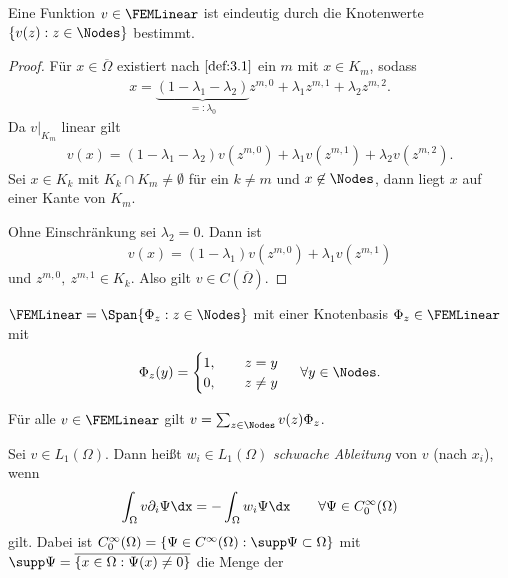 \begin{Satz}
    \label{satz:3.3}
    Eine Funktion $v \in \FEMLinear$ ist eindeutig durch die Knotenwerte $\{ v(z) : z \in \Nodes \}$ bestimmt.
\end{Satz}


\begin{proof}
    Für $x \in \overline\Omega$ existiert nach $\eqref{def:3.1}$ ein $m$ mit
    $x \in K_m$, sodass
    \begin{eqnarray*}
          x
        = \underbrace{(1 - \lambda_1 - \lambda_2)}_{=: \lambda_0} z^{m,0}
          + \lambda_1 z^{m,1} + \lambda_2 z^{m,2}.
    \end{eqnarray*}
    Da $v|_{K_m}$ linear gilt
    \begin{eqnarray*}
          v(x)
        = (1 - \lambda_1 - \lambda_2) v\left(z^{m,0}\right)
          + \lambda_1 v\left(z^{m,1}\right) + \lambda_2 v\left(z^{m,2}\right).
    \end{eqnarray*}
    Sei $x \in K_k$ mit $K_k \cap K_m \neq \emptyset$ für ein $k \neq m$ und
    $x \not \in \Nodes$, dann liegt $x$ auf einer Kante von $K_m$.

    Ohne Einschränkung sei $\lambda_2 = 0$. Dann ist
    \begin{eqnarray*}
          v(x)
        = (1 - \lambda_1) v\left(z^{m,0}\right)
          + \lambda_1 v\left(z^{m,1}\right)
    \end{eqnarray*}
    und $z^{m,0}, \ z^{m,1}\in K_k$.
    Also gilt $v\in C(\overline\Omega)$.
\end{proof}


\begin{Folgerung}
    \label{folgerung:3.4}
    $\FEMLinear = \Span\{\Phi_z: z \in \Nodes\}$ mit einer
    Knotenbasis $\Phi_z \in \FEMLinear$ mit
    \begin{eqnarray*}
        \Phi_z(y) = \begin{cases}
                  1, \qquad z = y \\
                  0, \qquad z \neq y
                \end{cases} \ \forall y \in \Nodes.
    \end{eqnarray*}
\end{Folgerung}


Für alle $v \in \FEMLinear$ gilt $v = \sum_{z\in\Nodes} v(z)
\Phi_z$.


\begin{Definition}
    \label{def:3.5}
    Sei $v \in L_1(\Omega)$. Dann heißt $w_i \in L_1(\Omega)$
    \emph{schwache Ableitung} von $v$ (nach $x_i$), wenn
    \begin{eqnarray*}
        \int_\Omega v \partial_i \Psi \dx = - \int_\Omega w_i \Psi \dx
        \qquad \forall \Psi \in C_0^\infty(\Omega)
    \end{eqnarray*}
    gilt. Dabei ist $C_0^\infty(\Omega) = \{\Psi \in C^\infty(\Omega): \supp\Psi
    \subset \Omega\}$ mit $\supp\Psi = \overline{\{x \in \Omega: \Psi(x)
    \neq 0\}}$ die Menge der 
\end{Definition}


